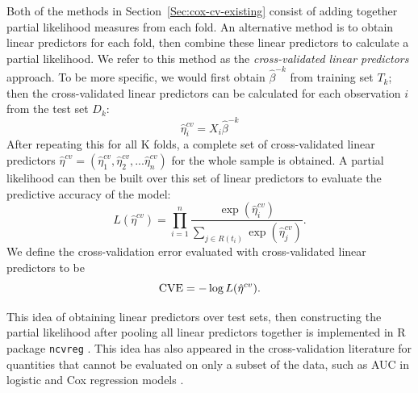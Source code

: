 \par Both of the methods in Section~\ref{Sec:cox-cv-existing} consist of adding together partial likelihood measures from each fold.  An alternative method is to obtain linear predictors for each fold, then combine these linear predictors to calculate a partial likelihood. We refer to this method as the \emph{cross-validated linear predictors} approach. To be more specific, we would first obtain $\hat{\beta}^{-k}$ from training set $T_{k}$; then the cross-validated linear predictors can be calculated for each observation $i$ from the test set $D_k$:  
\begin{equation}
  \label{eq:cv-lp}
  \hat{\eta}^{cv}_{i} = X_{i}\hat{\beta}^{-k}
\end{equation} 
After repeating this for all K folds, a complete set of cross-validated linear predictors $\hat{\eta}^{cv} = ( \hat{\eta}^{cv}_{1},  \hat{\eta}^{cv}_{2} , ...  \hat{\eta}^{cv}_{n})$ for the whole sample is obtained. A partial likelihood can then be built over this set of linear predictors to evaluate the predictive accuracy of the model: 
	\begin{equation} 
	L(\hat{\eta}^{cv}) = \prod_{i=1}^{n} \frac{\exp (\hat{\eta}^{cv}_{i})}{\sum_{ j \in R(t_{i})}\exp (\hat{\eta}^{cv}_{j})}.
	\end{equation}
We define the cross-validation error evaluated with cross-validated linear predictors to be $$\textrm{CVE} = - \log L(\hat{\eta}^{cv}).$$
  
\par This idea of obtaining linear predictors over test sets, then constructing the partial likelihood after pooling all linear predictors together is implemented in R package \texttt{ncvreg} \citep{ncvreg}. This idea has also appeared in the cross-validation literature for quantities that cannot be evaluated on only a subset of the data, such as AUC in logistic and Cox regression models \citep{Parker2007,Simon2011a,Subramanian2011}.

    
